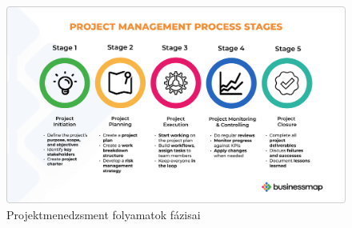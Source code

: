 \begin{figure}[H]
    \centering
    \includegraphics[width=130mm, keepaspectratio]{figures/project_management_process_stages.png}
    \caption{Projektmenedzsment folyamatok fázisai}
    \label{fig:project_management_process_stages}
\end{figure}
